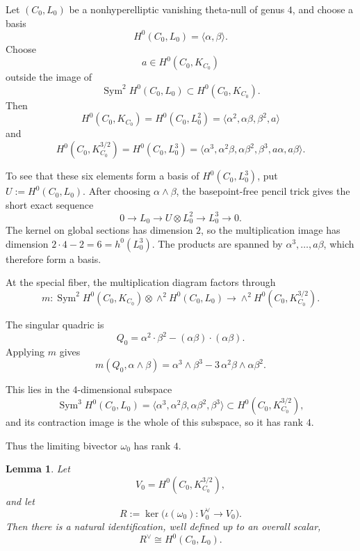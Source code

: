 \documentclass[10pt,a4paper]{amsart}
\newtheorem{lemma}[theorem]{Lemma}
\newcommand{\Sym}{\operatorname{Sym}}
\begin{document}
Let $(C_0,L_0)$ be a {nonhyperelliptic} vanishing theta-null of genus $4$, and choose a basis
\[
H^0(C_0,L_0)=\langle \alpha,\beta\rangle.
\]
Choose
\[
a\in H^0(C_0,K_{C_0})
\]
outside the image of
\[
\Sym^2 H^0(C_0,L_0)\subset H^0(C_0,K_{C_0}).
\]
Then
\[
H^0(C_0,K_{C_0})= H^0(C_0,L_0^2) = \langle \alpha^2,\alpha\beta,\beta^2,a\rangle
\]
and
\[
H^0(C_0,K_{C_0}^{3/2})
=  H^0(C_0,L_0^3) =
\langle \alpha^3,\alpha^2\beta,\alpha\beta^2,\beta^3,a\alpha,a\beta\rangle.
\]

\begingroup
{To see that these six elements form a basis of $H^0(C_0,L_0^3)$,
put $U:=H^0(C_0,L_0)$. After choosing $\alpha\wedge\beta$,
the basepoint-free pencil trick gives the short exact sequence}
\[
0\longrightarrow L_0\longrightarrow U\otimes L_0^2
\longrightarrow L_0^3\longrightarrow0.
\]
The kernel on global sections has dimension $2$, so the multiplication
image has dimension $2\cdot4-2=6=h^0(L_0^3)$.
{The products are spanned by $\alpha^3, \dots, a\beta$, which therefore form a basis.}
\endgroup

At the special fiber, the multiplication diagram factors through
\begin{equation}
m:\Sym^2 H^0(C_0,K_{C_0})\otimes \wedge^2 H^0(C_0,L_0)
\longrightarrow
\wedge^2 H^0(C_0,K_{C_0}^{3/2}).
\end{equation}

The singular quadric is
\[
Q_0=\alpha^2\cdot\beta^2-(\alpha\beta)\cdot(\alpha\beta).
\]
Applying $m$ gives
\begin{equation}
m(Q_0,\alpha\wedge\beta)
=
\alpha^3\wedge\beta^3-3\,\alpha^2\beta\wedge \alpha\beta^2.
\end{equation}

This lies in the $4$-dimensional subspace
\[
\Sym^3 H^0(C_0,L_0)
=
\langle \alpha^3,\alpha^2\beta,\alpha\beta^2,\beta^3\rangle
\subset H^0(C_0,K_{C_0}^{3/2}),
\]
and its contraction image is the whole of this subspace, so it has rank $4$.

Thus the limiting bivector $\omega_0$ has rank $4$.

\begin{lemma}\label{lem:Rdual}
Let
\[
V_0=H^0(C_0,K_{C_0}^{3/2}),
\]
and let
\[
R:=\ker\bigl(\iota(\omega_0):V_0^\vee\to V_0\bigr).
\]
Then there is a natural identification, well defined up to an overall scalar,
\[
R^\vee \cong H^0(C_0,L_0).
\]
\end{lemma}
\end{document}
